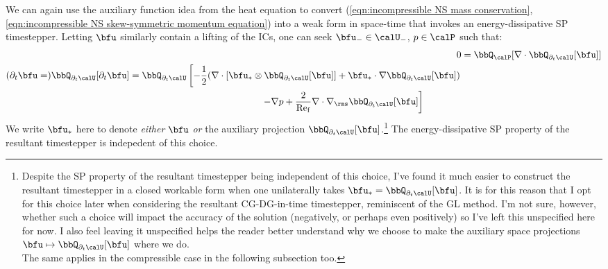     We can again use the auxiliary function idea from the heat equation to convert (\ref{eqn:incompressible NS mass conservation}, \ref{eqn:incompressible NS skew-symmetric momentum equation}) into a weak form in space-time that invokes an energy-dissipative SP timestepper. Letting $\bfu$ similarly contain a lifting of the ICs, one can seek $\bfu_{-} \in \calU_{-}$, $p \in \calP$ such that:
    \begin{align}
            0
            &=
            \bbQ_{\calP}[\nabla\cdot\bbQ_{\partial_{t}\calU}[\bfu]]  \label{eqn:incompressible NS weak form 1}  \\
        \begin{split}
            (\partial_{t}\bfu
            =)
            \bbQ_{\partial_{t}\calU}[\partial_{t}\bfu]
            &=
            \bbQ_{\partial_{t}\calU}\left[- \frac{1}{2}(\nabla\cdot\left[\bfu_{*}\otimes\bbQ_{\partial_{t}\calU}[\bfu]\right]
            + \bfu_{*}\cdot\nabla\bbQ_{\partial_{t}\calU}[\bfu])\right.  \\
            &\qquad\qquad\qquad\qquad\qquad\qquad\qquad\left.- \nabla p
            + \frac{2}{\rmRef}\nabla\cdot\nabla_{\rms}\bbQ_{\partial_{t}\calU}[\bfu]\right]
        \end{split}  \label{eqn:incompressible NS weak form 2}
    \end{align}
    We write $\bfu_{*}$ here to denote \emph{either} $\bfu$ \emph{or} the auxiliary projection $\bbQ_{\partial_{t}\calU}[\bfu]$.\footnote{Despite the SP property of the resultant timestepper being independent of this choice, I've found it much easier to construct the resultant timestepper in a closed workable form when one unilaterally takes $\bfu_{*} = \bbQ_{\partial_{t}\calU}[\bfu]$. It is for this reason that I opt for this choice later when considering the resultant CG-DG-in-time timestepper, reminiscent of the GL method. I'm not sure, however, whether such a choice will impact the accuracy of the solution (negatively, or perhaps even positively) so I've left this unspecified here for now. I also feel leaving it unspecified helps the reader better understand why we choose to make the auxiliary space projections $\bfu \mapsto \bbQ_{\partial_{t}\calU}[\bfu]$ where we do. \\ The same applies in the compressible case in the following subsection too.} The energy-dissipative SP property of the resultant timestepper is indepedent of this choice.
    
    \shortline
    

